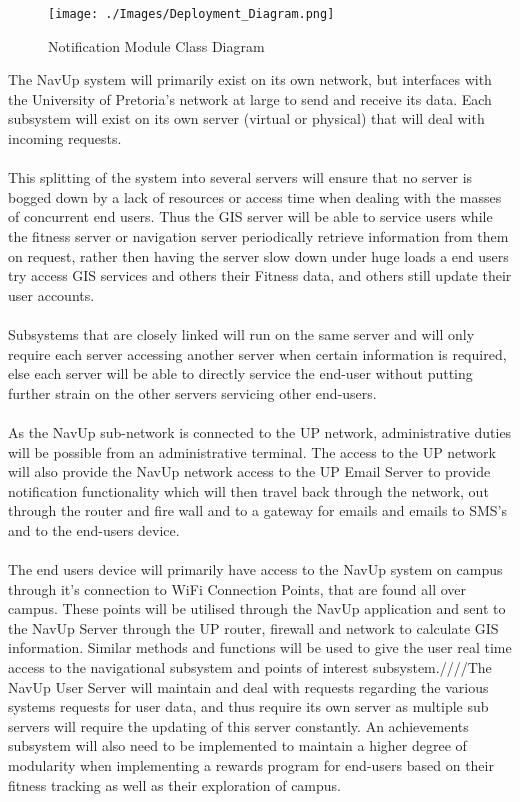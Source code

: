 \documentclass{article}
\begin{document}
			\begin{figure}[h]
				\texttt{[image: ./Images/Deployment\_Diagram.png]} 
				\caption{Notification Module Class Diagram}
			\end{figure}
			
			{The NavUp system will primarily exist on its own network, but interfaces with the University of Pretoria's network at large to send and receive its data. Each subsystem will exist on its own server (virtual or physical) that will deal with incoming requests.\\\\This splitting of the system into several servers will ensure that no server is bogged down by a lack of resources or access time when dealing with the masses of concurrent end users. Thus the GIS server will be able to service users while the fitness server or navigation server periodically retrieve information from them on request, rather then having the server slow down under huge loads a end users try access GIS services and others their Fitness data, and others still update their user accounts.\\\\Subsystems that are closely linked will run on the same server and will only require each server accessing another server when certain information is required, else each server will be able to directly service the end-user without putting further strain on the other servers servicing other end-users.\\\\As the NavUp sub-network is connected to the UP network, administrative duties will be possible from an administrative terminal. The access to the UP network will also provide the NavUp network access to the UP Email Server to provide notification functionality which will then travel back through the network, out through the router and fire wall and to a gateway for emails and emails to SMS's and to the end-users device.\\\\The end users device will primarily have access to the NavUp system on campus through it's connection to WiFi Connection Points, that are found all over campus. These points will be utilised through the NavUp application and sent to the NavUp Server through the UP router, firewall and network to calculate GIS information. Similar methods and functions will be used to give the user real time access to the navigational subsystem and points of interest subsystem.////The NavUp User Server will maintain and deal with requests regarding the various systems requests for user data, and thus require its own server as multiple sub servers will require the updating of this server constantly. An achievements subsystem will also need to be implemented to maintain a higher degree of modularity when implementing a rewards program for end-users based on their fitness tracking as well as their exploration of campus.}
\end{document}
